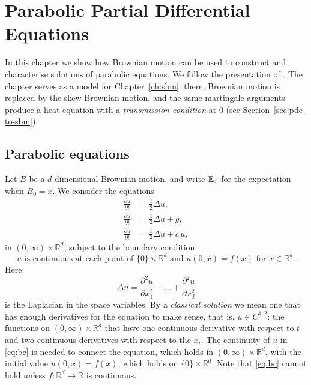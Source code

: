 \chapter{Parabolic Partial Differential Equations}\label{ch:pde}

In this chapter we show how Brownian motion can be used to construct and
characterise solutions of parabolic equations. We follow the presentation of
\citet{Durrett1996}. The chapter serves as a model for
Chapter~\ref{ch:sbm}: there, Brownian motion is replaced by the skew Brownian
motion, and the same martingale arguments produce a heat equation with a
\emph{transmission condition} at $0$ (see Section~\ref{sec:pde-to-sbm}).

\section{Parabolic equations}

Let $B$ be a $d$-dimensional Brownian motion, and write $\mathbb{E}_x$ for the
expectation when $B_0 = x$. We consider the equations
\begin{align}
	\frac{\partial u}{\partial t} & = \frac{1}{2}\Delta u, \label{eq:heat}        \\
	\frac{\partial u}{\partial t} & = \frac{1}{2}\Delta u + g, \label{eq:inhom}   \\
	\frac{\partial u}{\partial t} & = \frac{1}{2}\Delta u + c\,u, \label{eq:fk}
\end{align}
in $(0,\infty)\times\mathbb{R}^d$, subject to the boundary condition
\begin{equation}\label{eq:bc}
	u \text{ is continuous at each point of } \{0\}\times\mathbb{R}^d
	\text{ and } u(0,x) = f(x) \text{ for } x\in\mathbb{R}^d .
\end{equation}
Here
\[
	\Delta u = \frac{\partial^2 u}{\partial x_1^2} + \dots + \frac{\partial^2 u}{\partial x_d^2}
\]
is the Laplacian in the space variables. By a \emph{classical solution} we mean
one that has enough derivatives for the equation to make sense, that is,
$u \in C^{1,2}$: the functions on $(0,\infty)\times\mathbb{R}^d$ that have one
continuous derivative with respect to $t$ and two continuous derivatives with
respect to the $x_i$. The continuity of $u$ in \eqref{eq:bc} is needed to
connect the equation, which holds in $(0,\infty)\times\mathbb{R}^d$, with the
initial value $u(0,x) = f(x)$, which holds on $\{0\}\times\mathbb{R}^d$. Note
that \eqref{eq:bc} cannot hold unless
$f:\mathbb{R}^d\to\mathbb{R}$ is continuous.

